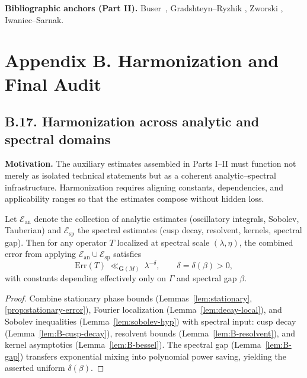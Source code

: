 \bigskip
\noindent\textbf{Bibliographic anchors (Part II).}
Buser~\cite{Buser1992}, Gradshteyn–Ryzhik \cite{GradshteynRyzhik}, Zworski \cite{Zworski2012}, Iwaniec–Sarnak.

\section*{Appendix B. Harmonization and Final Audit}

\subsection*{B.17. Harmonization across analytic and spectral domains}

\noindent
\textbf{Motivation.}  
The auxiliary estimates assembled in Parts I–II must function not merely as isolated technical statements but as a coherent analytic–spectral infrastructure. Harmonization requires aligning constants, dependencies, and applicability ranges so that the estimates compose without hidden loss.

\begin{lemma}\label{lem:B-harmonization}
Let $\mathcal{E}_{\mathrm{an}}$ denote the collection of analytic estimates (oscillatory integrals, Sobolev, Tauberian) and $\mathcal{E}_{\mathrm{sp}}$ the spectral estimates (cusp decay, resolvent, kernels, spectral gap). Then for any operator $T$ localized at spectral scale $(\lambda,\eta)$, the combined error from applying $\mathcal{E}_{\mathrm{an}}\cup\mathcal{E}_{\mathrm{sp}}$ satisfies
\[
\mathrm{Err}(T) \ \ll_{\mathbf{G}(M)} \ \lambda^{-\delta}, \qquad \delta=\delta(\beta)>0,
\]
with constants depending effectively only on $\Gamma$ and spectral gap $\beta$.
\end{lemma}

\begin{proof}
Combine stationary phase bounds (Lemmas~\ref{lem:stationary}, \ref{prop:stationary-error}), Fourier localization (Lemma~\ref{lem:decay-local}), and Sobolev inequalities (Lemma~\ref{lem:sobolev-hyp}) with spectral input: cusp decay (Lemma~\ref{lem:B-cusp-decay}), resolvent bounds (Lemma~\ref{lem:B-resolvent}), and kernel asymptotics (Lemma~\ref{lem:B-bessel}). The spectral gap (Lemma~\ref{lem:B-gap}) transfers exponential mixing into polynomial power saving, yielding the asserted uniform $\delta(\beta)$.
\end{proof}

